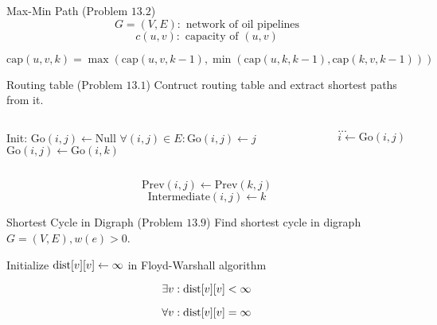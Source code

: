 \begin{frame}{}
  \begin{exampleblock}{Max-Min Path (Problem $13.2$)}
    \[
      G = (V, E): \text{ network of oil pipelines}
    \]
    \[
      c(u,v): \text{ capacity of } (u,v)
    \]
      
    \centerline{}
  \end{exampleblock}

  \pause
  \[
    \text{cap}(u,v,k) = \max(\text{cap}(u,v,k-1), \min(\text{cap}(u,k,k-1), \text{cap}(k,v,k-1)))
  \]
\end{frame}
\begin{frame}{}
  \begin{exampleblock}{Routing table (Problem $13.1$)}
    Contruct routing table and extract shortest paths from it.
  \end{exampleblock}

  \begin{columns}
      \begin{algorithmic}
	\State Init: $\text{Go}(i,j) \gets \text{Null}$
	\Statex
	\State $\forall (i,j) \in E: \text{Go}(i,j) \gets j$
	\Statex
	\If{$\dots$}
	  \State $\text{Go}(i,j) \gets \text{Go}(i,k)$
	\EndIf
      \end{algorithmic}
      \begin{algorithmic}
	  \State $\dots$
	\EndIf
	\Statex
	  \State $i \gets \text{Go}(i,j)$
	\EndWhile
      \end{algorithmic}
  \end{columns}

  \vspace{0.50cm}
  \[
    \text{Prev}(i,j) \gets \text{Prev}(k,j)
  \]
  \[
    \text{Intermediate}(i,j) \gets k
  \]
\end{frame}
\begin{frame}{}
  \begin{exampleblock}{Shortest Cycle in Digraph (Problem $13.9$)}
    Find shortest cycle in digraph $G = (V, E), w(e) > 0$.
  \end{exampleblock}

  \pause
  \vspace{0.50cm}
  \centerline{Initialize $\text{dist}[v][v] \gets \infty$ in Floyd-Warshall algorithm} 

  \pause
  \[
    \exists v: \text{dist}[v][v] < \infty
  \]

  \pause
  \[
    \forall v: \text{dist}[v][v] = \infty
  \]
\end{frame}
